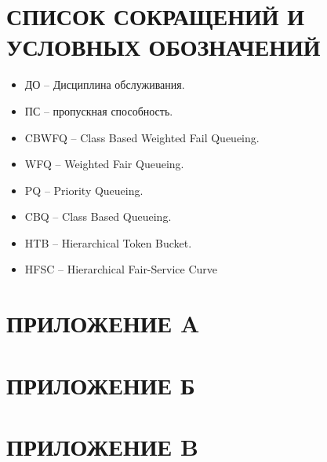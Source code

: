 \documentclass[14pt, a4paper] {extarticle}
\begin{document}
\setcounter{figure}{0}
\newcommand{\mc}[0]{\makecell}
\newcommand\setrow[1]{\gdef\rowmac{#1}#1\ignorespaces}
\newcommand\clearrow{\global\let\rowmac\relax}
\clearrow
   \setcounter{page}{3}

   \tableofcontents

	\newpage
	


	\newpage
	


	\newpage
	

	\newpage
	

	\newpage
	

	\newpage
    \renewcommand{\refname}{СПИСОК ИСПОЛЬЗОВАННЫХ ИСТОЧНИКОВ}
    
 
	\newpage
    \section*{СПИСОК СОКРАЩЕНИЙ И УСЛОВНЫХ ОБОЗНАЧЕНИЙ}

    \begin{itemize}
		\item ДО -- Дисциплина обслуживания.
		\item ПС -- пропускная способность.
    	\item CBWFQ -- Class Based Weighted Fail Queueing.
		\item WFQ -- Weighted Fair Queueing.
		\item PQ -- Priority Queueing.
		\item CBQ -- Class Based Queueing.
		\item HTB --  Hierarchical Token Bucket.
		\item HFSC -- Hierarchical Fair-Service Curve 
    \end{itemize}

	\newpage
    \section*{ПРИЛОЖЕНИЕ A}

	\newpage
    \section*{ПРИЛОЖЕНИЕ Б}

	\newpage
    \section*{ПРИЛОЖЕНИЕ B}
\end{document}
